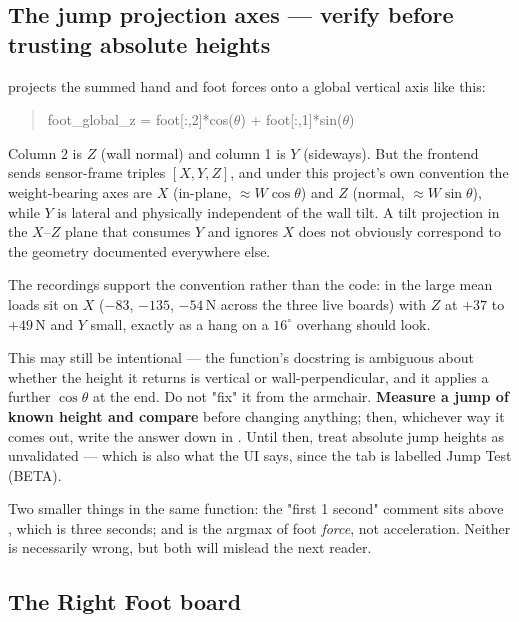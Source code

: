 \documentclass[11pt,a4paper]{article}
\begin{document}
\subsection{The jump projection axes --- verify before trusting absolute heights}

 projects the summed hand and foot
forces onto a global vertical axis like this:

\begin{quote}\ttfamily\small
foot\_global\_z = foot[:,2]*cos($\theta$) + foot[:,1]*sin($\theta$)
\end{quote}

Column 2 is $Z$ (wall normal) and column 1 is $Y$ (sideways). But the frontend
sends sensor-frame triples $[X, Y, Z]$, and under this project's own convention
the weight-bearing axes are $X$ (in-plane, $\approx W\cos\theta$) and $Z$
(normal, $\approx W\sin\theta$), while $Y$ is lateral and physically independent
of the wall tilt. A tilt projection in the $X$--$Z$ plane that consumes $Y$ and
ignores $X$ does not obviously correspond to the geometry documented everywhere
else.

The recordings support the convention rather than the code: in
 the large mean loads sit on $X$
($-83$, $-135$, $-54$\,N across the three live boards) with $Z$ at $+37$ to
$+49$\,N and $Y$ small, exactly as a hang on a $16^\circ$ overhang should look.

This may still be intentional --- the function's docstring is ambiguous about
whether the height it returns is vertical or wall-perpendicular, and it applies
a further $\cos\theta$ at the end. Do not "fix" it from the armchair.
\textbf{Measure a jump of known height and compare} before changing anything;
then, whichever way it comes out, write the answer down in
. Until then, treat absolute jump heights as
unvalidated --- which is also what the UI says, since the tab is labelled
\textsf{Jump Test (BETA)}.

Two smaller things in the same function: the "first 1 second" comment sits above
, which is three seconds; and
 is the argmax of foot \emph{force}, not acceleration.
Neither is necessarily wrong, but both will mislead the next reader.

\subsection{The Right Foot board}
\end{document}
